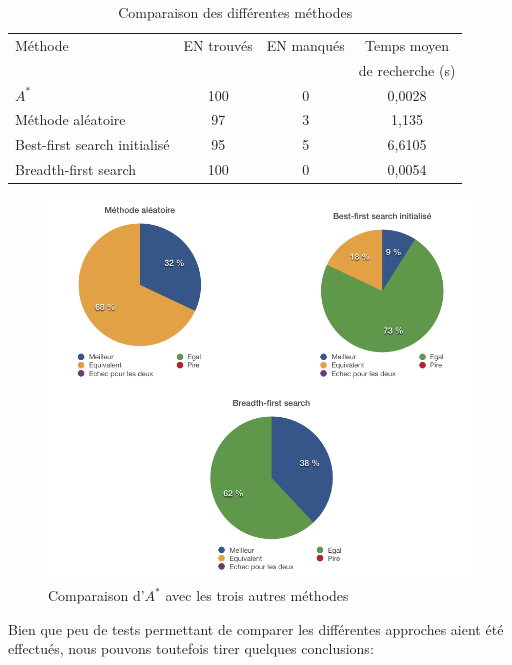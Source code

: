 \begin{table}[!ht]
	\caption{Comparaison des différentes méthodes}
	\label{tab:compMet}
	\begin{tabular}{|l||c|c|c|}
		\hline
		Méthode & EN trouvés & EN manqués & Temps moyen\\
				&			 &			 & de recherche (s)\\
		\hline
		\hline
		
		$A^*$ & 100 & 0 & 0,0028\\
		\hline
		Méthode aléatoire & 97 & 3 & 1,135\\
		\hline
		Best-first search initialisé & 95 & 5 & 6,6105 \\
		\hline
		Breadth-first search & 100 & 0 & 0,0054\\
		\hline
	\end{tabular}
	
\end{table}
\setlength{\overfullrule}{0pt}

\begin{figure}     
      \includegraphics[scale = 0.5]{test_projet/result_method}
		\caption{Comparaison d'$A^*$ avec les trois autres méthodes}
		\label{fromages}

\end{figure}
\setlength{\overfullrule}{10pt}
\FloatBarrier



Bien que peu de tests permettant de comparer les différentes approches aient été effectués, nous pouvons toutefois tirer quelques conclusions:

